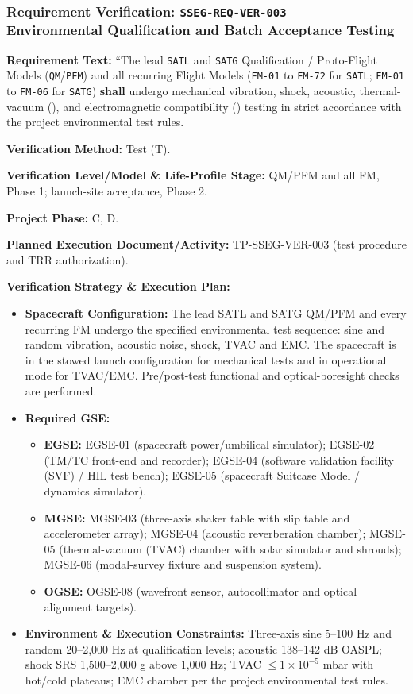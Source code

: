 \subsubsection{Requirement Verification: \texttt{SSEG-REQ-VER-003} --- Environmental Qualification and Batch Acceptance Testing}
\label{ver:SSEG-REQ-VER-003}
\textbf{Requirement Text:} ``The lead \texttt{SATL} and \texttt{SATG} Qualification / Proto-Flight Models (\texttt{QM}/\texttt{PFM}) and all recurring Flight Models (\texttt{FM-01} to \texttt{FM-72} for \texttt{SATL}; \texttt{FM-01} to \texttt{FM-06} for \texttt{SATG}) \textbf{shall} undergo mechanical vibration, shock, acoustic, thermal-vacuum (), and electromagnetic compatibility () testing in strict accordance with the project environmental test rules.
\par\textbf{Verification Method:} Test (T).
\par\textbf{Verification Level/Model \& Life-Profile Stage:} QM/PFM and all FM, Phase 1; launch-site acceptance, Phase 2.
\par\textbf{Project Phase:} C, D.
\par\textbf{Planned Execution Document/Activity:} TP-SSEG-VER-003 (test procedure and TRR authorization).
\par\textbf{Verification Strategy \& Execution Plan:}
\begin{itemize}
\item \textbf{Spacecraft Configuration:} The lead SATL and SATG QM/PFM and every recurring FM undergo the specified environmental test sequence: sine and random vibration, acoustic noise, shock, TVAC and EMC. The spacecraft is in the stowed launch configuration for mechanical tests and in operational mode for TVAC/EMC. Pre/post-test functional and optical-boresight checks are performed.
\item \textbf{Required GSE:}
\begin{itemize}
\item \textbf{EGSE:} EGSE-01 (spacecraft power/umbilical simulator); EGSE-02 (TM/TC front-end and recorder); EGSE-04 (software validation facility (SVF) / HIL test bench); EGSE-05 (spacecraft Suitcase Model / dynamics simulator).
\item \textbf{MGSE:} MGSE-03 (three-axis shaker table with slip table and accelerometer array); MGSE-04 (acoustic reverberation chamber); MGSE-05 (thermal-vacuum (TVAC) chamber with solar simulator and shrouds); MGSE-06 (modal-survey fixture and suspension system).
\item \textbf{OGSE:} OGSE-08 (wavefront sensor, autocollimator and optical alignment targets).
\end{itemize}
\item \textbf{Environment \& Execution Constraints:} Three-axis sine 5--100 Hz and random 20--2,000 Hz at qualification levels; acoustic 138--142 dB OASPL; shock SRS 1,500--2,000 g above 1,000 Hz; TVAC $\le$$1\times10^{-5}$ mbar with hot/cold plateaus; EMC chamber per the project environmental test rules.
\end{itemize}
